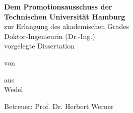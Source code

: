 \makeatletter

\begin{titlepage}
    \begin{center}
        \vspace*{1cm}
        \LARGE
        \textbf{\@title}

        \large
        \textbf{\@subtitle}

        \vspace{2.5cm}
        \textbf{Dem Promotionsausschuss der\\Technischen Universität Hamburg}\\[1ex]
        zur Erlangung des akademischen Grades\\[1ex]
        Doktor-Ingenieurin (Dr.-Ing.)\\[5ex]
        vorgelegte Dissertation

        \vspace{1.5cm}
        von\\ \@author

        \vspace{2cm}
        aus\\ Wedel

        \vspace{2cm}
        \@date
    \end{center}
    \vfill
    Betreuer: Prof. Dr. Herbert Werner
\end{titlepage}
\makeatother
